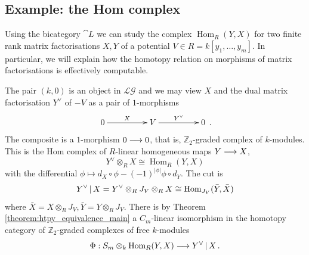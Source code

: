 \documentclass[english,letter paper,12pt,leqno]{article}
\theoremstyle{example}
\numberwithin{equation}{section}
\def\im{\operatorname{Im}}
\def\LG{\mathcal{LG}}
\def\Hom{\operatorname{Hom}}
\def\be{\begin{equation}}
\def\ee{\end{equation}}
\begin{document}
\subsection{Example: the Hom complex}\label{example:computing_homs}

Using the bicategory $\cat{L}$ we can study the complex $\Hom_R(Y,X)$ for two finite rank matrix factorisations $X,Y$ of a potential $V \in R = k[y_1,\ldots,y_m]$. In particular, we will explain how the homotopy relation on morphisms of matrix factorisations is effectively computable.

The pair $(k,0)$ is an object in $\LG$ and we may view $X$ and the dual matrix factorisation $Y^{\vee}$ of $-V$ as a pair of $1$-morphisms
\begin{equation}\label{eq:compute_hom_composition}
\xymatrix@C+2pc{
0 \ar[r]^-{X} & V \ar[r]^-{Y^{\vee}} & 0
}\,.
\end{equation}
The composite is a $1$-morphism $0 \longrightarrow 0$, that is, $\mathbb{Z}_2$-graded complex of $k$-modules. This is the Hom complex of $R$-linear homogeneous maps $Y \longrightarrow X$,
\[
Y^{\vee} \otimes_R X \cong \Hom_R(Y, X)
\]
with the differential $\phi \mapsto d_X \circ \phi - (-1)^{|\phi|} \phi \circ d_Y$. The cut is
\[
Y^{\vee} \l X = Y^{\vee} \otimes_R J_V \otimes_R X \cong \Hom_{J_V}( \bar{Y}, \bar{X} )
\]
where $\bar{X} = X \otimes_R J_V, \bar{Y} = Y \otimes_R J_V$. There is by Theorem \ref{theorem:htpy_equivalence_main} a $C_m$-linear isomorphism in the homotopy category of $\mathbb{Z}_2$-graded complexes of free $k$-modules
\be
\Phi: S_m \otimes_k \Hom_R(Y,X) \lto Y^{\vee} \l X\,.
\ee
\end{document}
